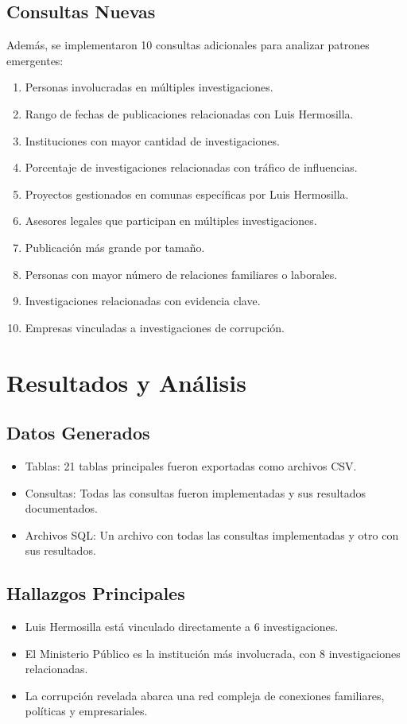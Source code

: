 \documentclass[a4paper, 12pt]{article}
\begin{document}
\subsection*{Consultas Nuevas}
Además, se implementaron 10 consultas adicionales para analizar patrones emergentes:
\begin{enumerate}
    \item Personas involucradas en múltiples investigaciones.
    \item Rango de fechas de publicaciones relacionadas con Luis Hermosilla.
    \item Instituciones con mayor cantidad de investigaciones.
    \item Porcentaje de investigaciones relacionadas con tráfico de influencias.
    \item Proyectos gestionados en comunas específicas por Luis Hermosilla.
    \item Asesores legales que participan en múltiples investigaciones.
    \item Publicación más grande por tamaño.
    \item Personas con mayor número de relaciones familiares o laborales.
    \item Investigaciones relacionadas con evidencia clave.
    \item Empresas vinculadas a investigaciones de corrupción.
\end{enumerate}

\section*{Resultados y Análisis}

\subsection*{Datos Generados}
\begin{itemize}
    \item Tablas: 21 tablas principales fueron exportadas como archivos CSV.
    \item Consultas: Todas las consultas fueron implementadas y sus resultados documentados.
    \item Archivos SQL: Un archivo con todas las consultas implementadas y otro con sus resultados.
\end{itemize}

\subsection*{Hallazgos Principales}
\begin{itemize}
    \item Luis Hermosilla está vinculado directamente a 6 investigaciones.
    \item El Ministerio Público es la institución más involucrada, con 8 investigaciones relacionadas.
    \item La corrupción revelada abarca una red compleja de conexiones familiares, políticas y empresariales.
\end{itemize}
\end{document}
